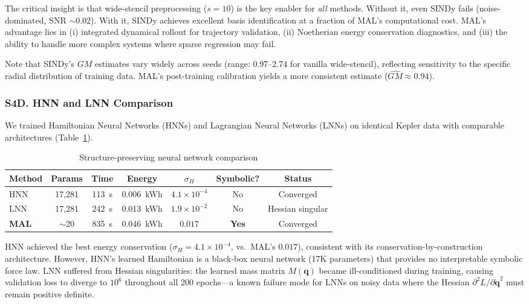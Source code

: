 \documentclass[9pt,twocolumn,twoside]{pnas-new}
\begin{document}
The critical insight is that wide-stencil preprocessing ($s=10$) is the key enabler for \textit{all} methods. Without it, even SINDy fails (noise-dominated, SNR $\sim 0.02$). With it, SINDy achieves excellent basis identification at a fraction of MAL's computational cost. MAL's advantage lies in (i) integrated dynamical rollout for trajectory validation, (ii) Noetherian energy conservation diagnostics, and (iii) the ability to handle more complex systems where sparse regression may fail.

Note that SINDy's $GM$ estimates vary widely across seeds (range: 0.97--2.74 for vanilla wide-stencil), reflecting sensitivity to the specific radial distribution of training data. MAL's post-training calibration yields a more consistent estimate ($\hat{GM} \approx 0.94$).

\subsubsection*{S4D. HNN and LNN Comparison}
We trained Hamiltonian Neural Networks (HNNs) \cite{Greydanus2019} and Lagrangian Neural Networks (LNNs) \cite{Cranmer2020LNN} on identical Kepler data with comparable architectures (Table~\ref{tab:hnn-lnn-si}).

\begin{table}[!ht]
\centering
\caption{Structure-preserving neural network comparison}
\label{tab:hnn-lnn-si}
\footnotesize
\begin{tabular}{lcccccc}
\hline
Method & Params & Time & Energy & $\sigma_H$ & Symbolic? & Status \\
\hline
HNN & 17,281 & 113~s & 0.006~kWh & $4.1 \times 10^{-4}$ & No & Converged \\
LNN & 17,281 & 242~s & 0.013~kWh & $1.9 \times 10^{-2}$ & No & Hessian singular \\
\textbf{MAL} & $\sim$20 & 835~s & 0.046~kWh & $0.017$ & \textbf{Yes} & Converged \\
\hline
\end{tabular}
\end{table}

HNN achieved the best energy conservation ($\sigma_H = 4.1 \times 10^{-4}$, vs.\ MAL's $0.017$), consistent with its conservation-by-construction architecture. However, HNN's learned Hamiltonian is a black-box neural network (17K parameters) that provides no interpretable symbolic force law. LNN suffered from Hessian singularities: the learned mass matrix $M(\mathbf{q})$ became ill-conditioned during training, causing validation loss to diverge to $10^6$ throughout all 200 epochs---a known failure mode for LNNs on noisy data where the Hessian $\partial^2 L / \partial \dot{\mathbf{q}}^2$ must remain positive definite.
\end{document}

